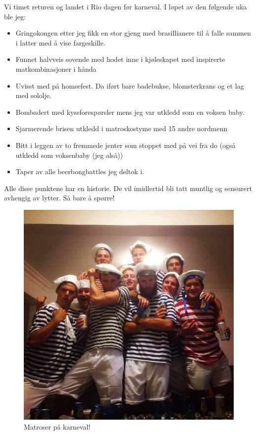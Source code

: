 Vi timet returen og landet i Rio dagen før karneval. I løpet av den
følgende uka ble jeg:

\begin{itemize}
	\item  Gringokongen  etter jeg fikk  en stor gjeng med brasillianere til å falle
		sammen i latter med å vise fargeskille.
	\item Funnet halvveis sovende med hodet inne i kjøleskapet med
		inspirerte matkombinasjoner i hånda
	\item   Uvisst med på homsefest. Da iført bare badebukse, blomsterkrans og et lag med sololje.
	\item Bombadert med kyssforespørsler mens jeg var utkledd
		som en voksen baby.
	\item Sjarmerende brisen utkledd i matroskostyme med 15 andre
		nordmenn
	\item  Bitt i leggen av to fremmede jenter som stoppet
		med på vei fra do (også utkledd som voksenbaby (jeg
		alså))
	\item Taper av alle beerbongbattles jeg deltok i.
	
\end{itemize}

Alle disse punktene har en historie. De vil imidlertid bli tatt
muntlig og sensurert avhengig av lytter. Så bare å spørre!

\begin{figure}[H]
	\centering
	\includegraphics[width=\textwidth]{matroser}
	\caption*{Matroser på karneval!}
	\label{fig:karneval}
\end{figure}


